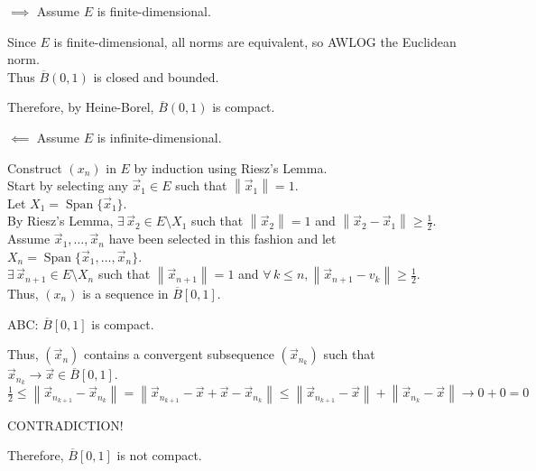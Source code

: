\documentclass[letterpaper,12pt,fleqn]{article}
\newcommand{\vx}{\vec{x}}
\newcommand{\norm}[1]{\left\|#1\right\|}
\newcommand{\cl}[1]{\overline{#1}}
\DeclareMathOperator{\spn}{Span}
\begin{document}
\begin{theproof}
  \listbreak
  \begin{description}
  \item $\implies$ Assume $E$ is finite-dimensional.

    Since $E$ is finite-dimensional, all norms are equivalent, so AWLOG the
    Euclidean norm. \\
    Thus $\cl{B}(0,1)$ is closed and bounded.

    Therefore, by Heine-Borel, $\cl{B}(0,1)$ is compact.

  \item $\impliedby$ Assume $E$ is infinite-dimensional.

    Construct $(x_n)$ in $E$ by induction using Riesz's Lemma. \\
    Start by selecting any $\vx_1\in E$ such that $\norm{\vx_1}=1$. \\
    Let $X_1=\spn\{\vx_1\}$. \\
    By Riesz's Lemma, $\exists\,\vx_2\in E\setminus X_1$ such that
    $\norm{\vx_2}=1$ and $\norm{\vx_2-\vx_1}\ge\frac{1}{2}$. \\
    Assume $\vx_1,\ldots,\vx_n$ have been selected in this fashion and let
    $X_n=\spn\{\vx_1,\ldots,\vx_n\}$. \\
    $\exists\,\vx_{n+1}\in E\setminus X_n$ such that $\norm{\vx_{n+1}}=1$ and
    $\forall\,k\le n,\norm{\vx_{n+1}-v_k}\ge\frac{1}{2}$. \\
    Thus, $(x_n)$ is a sequence in $\cl{B}[0,1]$.

    ABC: $\cl{B}[0,1]$ is compact.

    Thus, $(\vx_n)$ contains a convergent subsequence $(\vx_{n_k})$ such that
    $\vx_{n_k}\to\vx\in\cl{B}[0,1]$. \\
    $\frac{1}{2}\le\norm{\vx_{n_{k+1}}-\vx_{n_k}}=
    \norm{\vx_{n_{k+1}}-\vx+\vx-\vx_{n_k}}\le
    \norm{\vx_{n_{k+1}}-\vx}+\norm{\vx_{n_k}-\vx}\to0+0=0$

    CONTRADICTION!

    Therefore, $\cl{B}[0,1]$ is not compact.
  \end{description}
\end{theproof}
\end{document}
